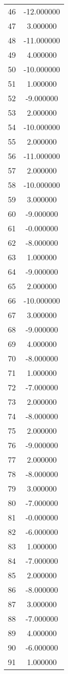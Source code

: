 \documentclass[12pt]{article}
\begin{document}
\begin{longtable}{@{}cc@{}}
46 & -12.000000 \\
47 & 3.000000 \\
48 & -11.000000 \\
49 & 4.000000 \\
50 & -10.000000 \\
51 & 1.000000 \\
52 & -9.000000 \\
53 & 2.000000 \\
54 & -10.000000 \\
55 & 2.000000 \\
56 & -11.000000 \\
57 & 2.000000 \\
58 & -10.000000 \\
59 & 3.000000 \\
60 & -9.000000 \\
61 & -0.000000 \\
62 & -8.000000 \\
63 & 1.000000 \\
64 & -9.000000 \\
65 & 2.000000 \\
66 & -10.000000 \\
67 & 3.000000 \\
68 & -9.000000 \\
69 & 4.000000 \\
70 & -8.000000 \\
71 & 1.000000 \\
72 & -7.000000 \\
73 & 2.000000 \\
74 & -8.000000 \\
75 & 2.000000 \\
76 & -9.000000 \\
77 & 2.000000 \\
78 & -8.000000 \\
79 & 3.000000 \\
80 & -7.000000 \\
81 & -0.000000 \\
82 & -6.000000 \\
83 & 1.000000 \\
84 & -7.000000 \\
85 & 2.000000 \\
86 & -8.000000 \\
87 & 3.000000 \\
88 & -7.000000 \\
89 & 4.000000 \\
90 & -6.000000 \\
91 & 1.000000 \\

\end{longtable}
\end{document}
